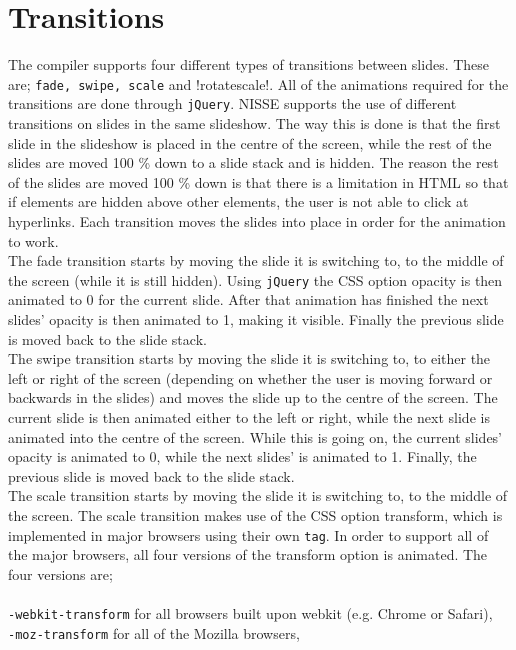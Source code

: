 \section{Transitions}
The compiler supports four different types of transitions between slides. These are; \lstinline!fade, swipe, scale! and \lstline!rotatescale!. All of the animations required for the transitions are done through \texttt{jQuery}. NISSE supports the use of different transitions on slides in the same slideshow. The way this is done is that the first slide in the slideshow is placed in the centre of the screen, while the rest of the slides are moved 100 \% down to a slide stack and is hidden. The reason the rest of the slides are moved 100 \% down is that there is a limitation in HTML so that if elements are hidden above other elements, the user is not able to click at hyperlinks. Each transition moves the slides into place in order for the animation to work.\\
The fade transition starts by moving the slide it is switching to, to the middle of the screen (while it is still hidden). Using \texttt{jQuery} the CSS option opacity is then animated to 0 for the current slide. After that animation has finished the next slides' opacity is then animated to 1, making it visible. Finally the previous slide is moved back to the slide stack. \\
The swipe transition starts by moving the slide it is switching to, to either the left or right of the screen (depending on whether the user is moving forward or backwards in the slides) and moves the slide up to the centre of the screen. The current slide is then animated either to the left or right, while the next slide is animated into the centre of the screen. While this is going on, the current slides' opacity is animated to 0, while the next slides' is animated to 1. Finally, the previous slide is moved back to the slide stack. \\
The scale transition starts by moving the slide it is switching to, to the middle of the screen. The scale transition makes use of the CSS option transform, which is implemented in major browsers using their own \texttt{tag}. In order to support all of the major browsers, all four versions of the transform option is animated. The four versions are; \\ \\
\texttt{-webkit-transform} for all browsers built upon webkit (e.g. Chrome or Safari), \\
\texttt{-moz-transform} for all of the Mozilla browsers, \\
